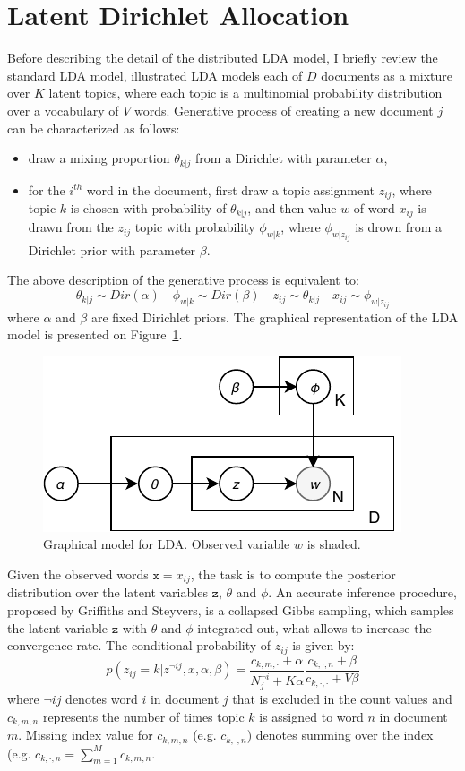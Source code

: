 \documentclass[journal]{IEEEtran}
\begin{document}
\section{Latent Dirichlet Allocation}
Before describing the detail of the distributed LDA model, I briefly review the standard LDA model, illustrated LDA models each of $D$ documents as a mixture over $K$ latent topics, where each topic is a multinomial probability distribution over a vocabulary of $V$ words. Generative process of creating a new document $j$ can be characterized as follows:
\begin{itemize}
\item draw a mixing proportion $\theta_{k|j}$ from a Dirichlet with parameter $\alpha$,
\item for the $i^{th}$ word in the document, first draw a topic assignment $z_{ij}$, where topic $k$ is chosen with probability of $\theta_{k|j}$, and then value $w$ of word $x_{ij}$ is drawn from the $z_{ij}$ topic with probability $\phi_{w|k}$, where $\phi_{w|z_{ij}}$ is drown from a Dirichlet prior with parameter $\beta$.
\end{itemize}
The above description of the generative process is equivalent to:
$$
\theta_{k|j}\sim Dir(\alpha) \quad \phi_{w|k}\sim Dir(\beta) \quad  z_{ij}\sim \theta_{k|j} \quad  x_{ij}\sim \phi_{w|z_{ij}}
$$
where $\alpha$ and $\beta$ are fixed Dirichlet priors. The graphical representation of the LDA model is presented on Figure~\ref{fig:lda}.
\begin{figure}
\centering
\includegraphics[scale=0.9]{plots/LDA.pdf}
\caption{Graphical model for LDA. Observed variable $w$ is shaded.}
\label{fig:lda}
\end{figure}

Given the observed words $\texttt{x}=x_{ij}$, the task is to compute the posterior distribution over the latent variables $\texttt{z}$, $\theta$ and $\phi$. An accurate inference procedure, proposed by Griffiths and Steyvers\cite{griffiths2004finding}, is a collapsed Gibbs sampling, which samples the latent variable $\texttt{z}$ with $\theta$ and $\phi$ integrated out, what allows to increase the convergence rate. The conditional probability of $z_{ij}$ is given by:
$$
p(z_{ij}=k|z^{\lnot ij}, x, \alpha, \beta) = \dfrac{c_{k,m,\cdot} + \alpha}{N_{j}^{\lnot i}+K\alpha} \frac{c_{k,\cdot,n} + \beta}{c_{k,\cdot,\cdot} + V\beta}
$$ 
where $\lnot ij$ denotes word $i$ in document $j$ that is excluded in the count values and $c_{k,m,n}$ represents the number of times topic $k$ is assigned to word $n$ in document $m$. Missing index value for $c_{k,m,n}$ (e.g. $c_{k,\cdot,n}$) denotes summing over the index (e.g. $c_{k,\cdot,n} = \sum_{m=1}^{M} c_{k,m,n}$.
\end{document}
